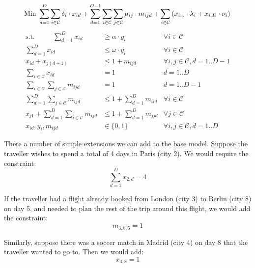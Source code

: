 \documentclass[12pt]{article}
\begin{document}
\begin{equation*}
\text{Min } \sum_{d=1}^{D} \sum_{i \in \mathcal{C}} \delta_{i} \cdot x_{id} + \sum_{d=1}^{D-1} \sum_{i \in \mathcal{C}} \sum_{j \in \mathcal{C}} \mu_{ij} \cdot m_{ijd} + \sum_{i \in \mathcal{C}} \left( x_{i,1} \cdot \lambda_{i} + x_{i,D} \cdot \nu_{i} \right)\\
\end{equation*}
\begin{align}
\text{s.t.~~~~~~~~} \sum_{d=1}^{D} x_{id} & \geq \alpha \cdot y_{i} & \forall i \in \mathcal{C} \label{BM:minDays}\\
\sum_{d=1}^{D} x_{id} & \leq \omega \cdot y_{i} &  \forall i \in \mathcal{C} \label{BM:maxDays}\\
x_{id} + x_{j(d+1)} & \leq 1 + m_{ijd} & \forall i,j \in \mathcal{C}, d = 1..D-1 \label{BM:move}\\
\sum_{i \in \mathcal{C}} x_{id} &= 1 & d = 1..D \label{BM:city} \\
\sum_{i \in \mathcal{C}} \sum_{j \in \mathcal{C}} m_{ijd} &= 1 & d = 1..D-1 \label{BM:moveOnce}\\
\sum_{d=1}^{D} \sum_{j \in \mathcal{C}} m_{ijd} &\leq 1 + \sum_{d=1}^{D} m_{iid} & \forall i \in \mathcal{C} \label{BM:leaveOnce}\\
x_{j1} + \sum_{d=1}^{D} \sum_{i \in \mathcal{C}} m_{ijd} &\leq 1 + \sum_{d=1}^{D} m_{jjd} & \forall j \in \mathcal{C}\label{BM:arriveOnce}\\
x_{id}, y_{i}, m_{ijd} & \in \{0,1\} & \forall i, j \in \mathcal{C}, d = 1..D \label{BM:8}
\end{align}



There a number of simple extensions we can add to the base model. Suppose the traveller wishes to spend a total of 4 days in Paris (city 2). We would require the constraint:
\begin{equation*}
\sum_{d=1}^{D} x_{2,d} = 4
\end{equation*}

If the traveller had a flight already booked from London (city 3) to Berlin (city 8) on day 5, and needed to plan the rest of the trip around this flight, we would add the constraint:
\begin{equation*}
m_{3,8,5} = 1
\end{equation*}

Similarly, suppose there was a soccer match in Madrid (city 4) on day 8 that the traveller wanted to go to. Then we would add:
\begin{equation*}
x_{4,8} = 1
\end{equation*}
\end{document}
